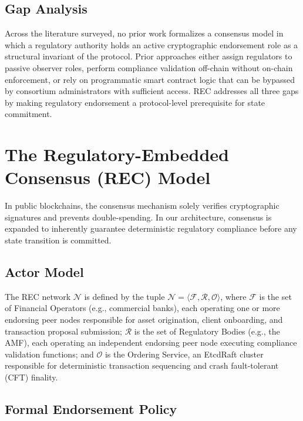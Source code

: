 \documentclass[journal,10pt,twocolumn]{IEEEtran}
\begin{document}
\subsection{Gap Analysis}

Across the literature surveyed, no prior work formalizes a consensus model in which a regulatory authority holds an active cryptographic endorsement role as a structural invariant of the protocol. Prior approaches either assign regulators to passive observer roles, perform compliance validation off-chain without on-chain enforcement, or rely on programmatic smart contract logic that can be bypassed by consortium administrators with sufficient access. REC addresses all three gaps by making regulatory endorsement a protocol-level prerequisite for state commitment.

\section{The Regulatory-Embedded Consensus (REC) Model}
\label{sec:rec}

In public blockchains, the consensus mechanism solely verifies cryptographic signatures and prevents double-spending. In our architecture, consensus is expanded to inherently guarantee deterministic regulatory compliance before any state transition is committed.

\subsection{Actor Model}

The REC network $\mathcal{N}$ is defined by the tuple $\mathcal{N} = \langle \mathcal{F}, \mathcal{R}, \mathcal{O} \rangle$, where $\mathcal{F}$ is the set of Financial Operators (e.g., commercial banks), each operating one or more endorsing peer nodes responsible for asset origination, client onboarding, and transaction proposal submission; $\mathcal{R}$ is the set of Regulatory Bodies (e.g., the AMF), each operating an independent endorsing peer node executing compliance validation functions; and $\mathcal{O}$ is the Ordering Service, an EtcdRaft cluster responsible for deterministic transaction sequencing and crash fault-tolerant (CFT) finality.

\subsection{Formal Endorsement Policy}
\end{document}
